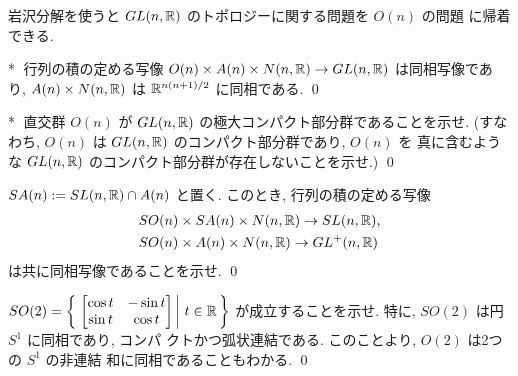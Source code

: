 \documentclass[12pt,twoside]{jarticle}
\def\qstar#1{$\!\!\!$#1$\;$}
\begin{document}
岩沢分解を使うと $GL(n,{\mathbb R})$ のトポロジーに関する問題を $O(n)$ の問題
に帰着できる.

\begin{question}[岩沢分解2]\label{q:Iwasawa2}\qstar{*}
  行列の積の定める写像 %
  $O(n)\times A(n) \times N(n,{\mathbb R}) \rightarrow GL(n,{\mathbb R})$ は同相写像であ
  り, $A(n) \times N(n,{\mathbb R})$ は ${\mathbb R}^{n(n+1)/2}$ に同相である. \qed
\end{question}

\begin{question}\qstar{*}
  直交群 $O(n)$ が $GL(n,{\mathbb R})$ の極大コンパクト部分群であることを示せ.
  (すなわち, $O(n)$ は $GL(n,{\mathbb R})$ のコンパクト部分群であり, $O(n)$ を
  真に含むような $GL(n,{\mathbb R})$ のコンパクト部分群が存在しないことを示せ.)
  \qed
\end{question}

\begin{question}[岩沢分解3]\label{q:Iwasawa3}
  $SA(n) := SL(n,{\mathbb R}) \cap A(n)$ と置く. このとき, 行列の積の定める写像 %
  \begin{align*}
  & SO(n)\times SA(n) \times N(n,{\mathbb R}) \rightarrow SL(n,{\mathbb R}),
  \\
  & SO(n)\times A(n) \times N(n,{\mathbb R}) \rightarrow GL^+(n,{\mathbb R})    
  \end{align*}
  は共に同相写像であることを示せ. \qed
\end{question}

\begin{question}
  \( \displaystyle
    SO(2)
    =
    \left\{\,
    \left.
      \begin{bmatrix} \cos t & - \sin t \\ \sin t & \cos t \end{bmatrix}
    \,\right|\,
      t \in {\mathbb R}
    \,\right\}
  \) %
  が成立することを示せ. 特に, $SO(2)$ は円 $S^1$ に同相であり, コンパ
  クトかつ弧状連結である. このことより, $O(2)$ は2つの $S^1$ の非連結
  和に同相であることもわかる. \qed
\end{question}
\end{document}
